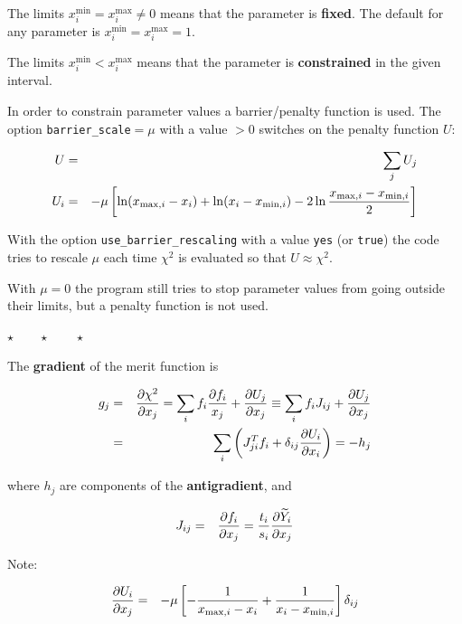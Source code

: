 \documentclass[a4paper,12pt,pdftex,onecolumn]{article}
\newcommand{\stars}{\begin{center}%
\vspace{1em plus 0.5em minus 0.5em}%
$\star \qquad \star \qquad \star$%
\vspace{1em plus 0.5em minus 0.5em}%
\end{center}}
\begin{document}
The limits $x_i^{\mathrm{min}} = x_i^{\mathrm{max}} \neq 0$
means that the parameter is \textbf{fixed}.
The default for any parameter is $x_i^{\mathrm{min}} = x_i^{\mathrm{max}} = 1$.

The limits $x_i^{\mathrm{min}} < x_i^{\mathrm{max}}$
means that the parameter is \textbf{constrained} in the given interval.

In order to constrain parameter values a barrier/penalty function is used.
The option \verb+barrier_scale+$=\mu$ with a value $>0$ switches on the penalty
function $U$:

\begin{eqnarray}
U &=& \sum_j U_j \\
U_i &=& - \mu \left[ \ln (x_{\mathrm{max},i}-x_i) + \ln (x_i - x_{\mathrm{min},i})
- 2 \ln {x_{\mathrm{max},i} - x_{\mathrm{min},i} \over 2} \right]
\end{eqnarray}

With the option \verb+use_barrier_rescaling+ with a value \verb+yes+ (or \verb+true+)
the code tries to rescale $\mu$ each time $\chi^2$ is evaluated so that $U \approx \chi^2$.

With $\mu=0$ the program still tries to stop parameter values from going outside their
limits, but a penalty function is not used.

\stars

The \textbf{gradient} of the merit function is

\begin{eqnarray}
g_j &=& {\partial \chi^2 \over \partial x_j}
= \sum_i f_i {\partial f_i \over x_j} + {\partial U_j \over \partial x_j}
 \equiv  \sum_i f_i J_{ij} + {\partial U_j \over \partial x_j} \\
&=& \sum_i \left( J^T_{ji} f_i + \delta_{ij} {\partial U_i \over \partial x_i} \right)
= -h_j
\end{eqnarray}

where $h_j$ are components of the \textbf{antigradient}, and

\begin{eqnarray}
J_{ij} &=& {\partial f_i \over \partial x_j}
= {t_i \over s_i} {\partial \widetilde{Y}_i \over \partial x_j}
\end{eqnarray}

Note:

\begin{eqnarray}
{\partial U_i \over \partial x_j}
&=& - \mu \left[ - {1 \over x_{\mathrm{max},i}-x_i} + {1 \over x_i - x_{\mathrm{min},i}} \right] \delta_{ij}
\end{eqnarray}
\end{document}
